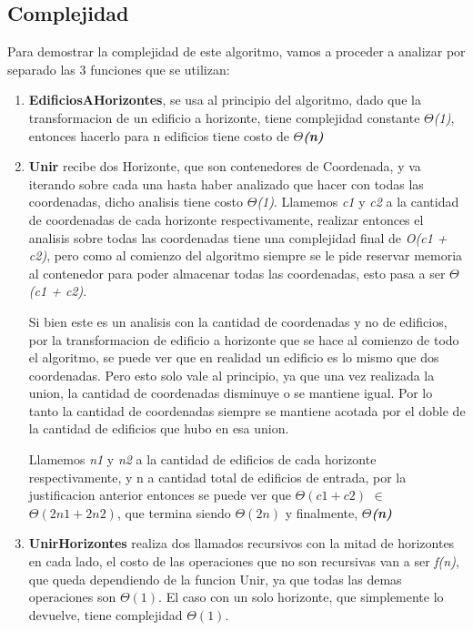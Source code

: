 \documentclass[10pt,a4paper]{article}
\begin{document}
\newpage
\subsection{Complejidad}
Para demostrar la complejidad de este algoritmo, vamos a proceder a analizar por separado las 3 funciones que se utilizan:
\begin{enumerate}
\bigskip
\item \textbf{EdificiosAHorizontes}, se usa al principio del algoritmo, dado que la transformacion de un edificio a horizonte, tiene complejidad constante $\Theta$\textit{(1)}, entonces hacerlo para n edificios tiene costo de \textbf{$\Theta$\textit{(n)}}\bigskip
\item \textbf{Unir} recibe dos Horizonte, que son contenedores de Coordenada, y va iterando sobre cada una hasta haber analizado que hacer con todas las coordenadas, dicho analisis tiene costo $\Theta$\textit{(1)}. Llamemos \textit{c1} y \textit{c2} a la cantidad de coordenadas de cada horizonte respectivamente, realizar entonces el analisis sobre todas las coordenadas tiene una complejidad final de \textit{O(c1 + c2)}, pero como al comienzo del algoritmo siempre se le pide reservar memoria al contenedor para poder almacenar todas las coordenadas, esto pasa a ser $\Theta$\textit{(c1 + c2)}.

Si bien este es un analisis con la cantidad de coordenadas y no de edificios, por la transformacion de edificio a horizonte que se hace al comienzo de todo el algoritmo, se puede ver que en realidad un edificio es lo mismo que dos coordenadas. Pero esto solo vale al principio, ya que una vez realizada la union, la cantidad de coordenadas disminuye o se mantiene igual. Por lo tanto la cantidad de coordenadas siempre se mantiene acotada por el doble de la  cantidad de edificios que hubo en esa union.

Llamemos \textit{n1} y \textit{n2} a la cantidad de edificios de cada horizonte respectivamente, y n a cantidad total de edificios de entrada, por la justificacion anterior entonces se puede ver que \textit{$\Theta(c1 + c2)$} $\in$ \textit{$\Theta(2n1 + 2n2)$}, que termina siendo \textit{$\Theta(2n)$} y finalmente, \textit{\textbf{$\Theta$(n)}}
\bigskip
\item \textbf{UnirHorizontes} realiza dos llamados recursivos con la mitad de horizontes en cada lado, el costo de las operaciones que no son recursivas van a ser \textit{f(n)}, que queda dependiendo de la funcion Unir, ya que todas las demas operaciones son $\Theta(1)$. El caso con un solo horizonte, que simplemente lo devuelve, tiene complejidad $\Theta(1)$.


\end{enumerate}
\end{document}
